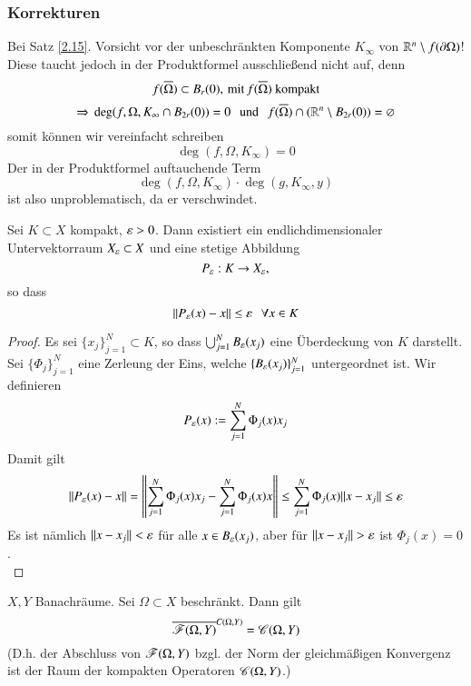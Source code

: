 \subsubsection*{Korrekturen}

Bei Satz \ref{2.15}. Vorsicht vor der unbeschränkten Komponente $K_\infty$ von $\mathbb{R}^n\setminus f(\partial
\Omega)$! Diese taucht jedoch in der Produktformel ausschließend nicht auf, denn
\[
    f(\overline \Omega)\subset B_r(0), \, \text{mit}\, f(\overline \Omega) \text{ kompakt}
\]
\[
    \Rightarrow \, \deg(f,\Omega,K_\infty\cap B_{2r}(0))=0 \hspace{.25cm} \text{und} \hspace{.25cm} f(\overline \Omega) \cap (\mathbb{R}^n\setminus
    B_{2r}(0))=\varnothing
\]
somit können wir vereinfacht schreiben
\[
    \deg(f,\Omega,K_\infty)=0
\]
Der in der Produktformel auftauchende Term
\[
    \deg(f,\Omega,K_\infty)\cdot \deg(g,K_\infty,y)
\]
ist also unproblematisch, da er verschwindet.\\[0.5cm]

\begin{lem}\label{3.5}
    Sei $K\subset X$ kompakt, $\varepsilon>0$. Dann existiert ein endlichdimensionaler Untervektorraum $X_\varepsilon
    \subset X$ und eine stetige Abbildung
    \[
        P_\varepsilon:K\rightarrow X_\varepsilon,
    \]
    so dass
    \[
        \|P_\varepsilon(x)-x\|\leq \varepsilon \hspace{.25cm} \forall x\in K
    \]
\end{lem}

\begin{proof}
    Es sei $\{x_j\}_{j=1}^N\subset K$, so dass $\bigcup _{j=1}^NB_\varepsilon(x_j)$ eine Überdeckung von $K$
    darstellt. Sei $\{\Phi_j\}_{j=1}^N$ eine Zerleung der Eins, welche $\{B_\varepsilon(x_j)\}_{j=1}^N$
    untergeordnet ist. Wir definieren
    \[
        P_\varepsilon(x):= \sum_{j=1}^N \Phi_j(x)x_j
    \]
    Damit gilt
    \[
        \|P_\varepsilon(x)-x\|=\left\|\sum_{j=1}^N\Phi_j(x)x_j-\sum_{j=1}^N \Phi_j(x)x\right\|
        \leq \sum_{j=1}^N \Phi_j(x)\|x-x_j\|\leq \varepsilon
    \]
    Es ist nämlich $\|x-x_j\|< \varepsilon$ für alle $x\in B_\varepsilon(x_j)$, aber für $\|x-x_j\|>\eps$ ist
    $\Phi_j(x)=0$.
    \[ \]
\end{proof}

\begin{theorem}\label{3.6}
    $X,Y$ Banachräume. Sei $\Omega\subset X$ beschränkt. Dann gilt
    \[
        \overline{\mathscr F(\Omega,Y)}^{C(\Omega,Y)}=\mathscr C(\Omega,Y)
    \]
    (D.h. der Abschluss von $\mathscr F(\Omega,Y)$ bzgl. der Norm der gleichmäßigen Konvergenz ist der Raum
     der kompakten Operatoren $\mathscr C(\Omega,Y)$.)
\end{theorem}

